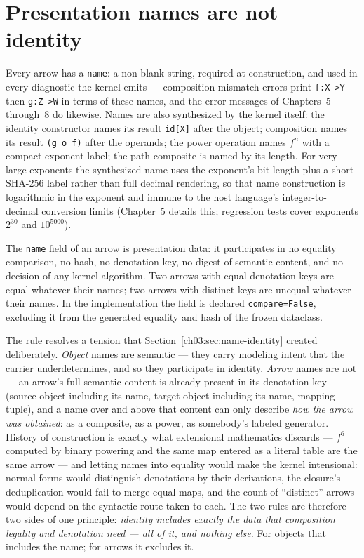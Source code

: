 \section{Presentation names are not identity}\label{ch03:sec:presentation-names}

Every arrow has a \texttt{name}: a non-blank string, required at
construction, and used in every diagnostic the kernel emits ---
composition mismatch errors print
\texttt{f:X->Y} then \texttt{g:Z->W} in terms of these names, and the
error messages of Chapters~5 through~8 do likewise. Names are also
synthesized by the kernel itself: the identity constructor names its
result \texttt{id[X]} after the object; composition names its result
\texttt{(g o f)} after the operands; the power operation names
$f^{n}$ with a compact exponent label; the path composite is named by its
length. For very large exponents the synthesized name uses the exponent's
bit length plus a short SHA-256 label rather than full decimal rendering,
so that name construction is logarithmic in the exponent and immune to the
host language's integer-to-decimal conversion limits (Chapter~5 details
this; regression tests cover exponents $2^{30}$ and $10^{5000}$).

\begin{ruleenv}\label{ch03:rule:names-out}
The \texttt{name} field of an arrow is presentation data: it participates
in no equality comparison, no hash, no denotation key, no digest of
semantic content, and no decision of any kernel algorithm. Two arrows with
equal denotation keys are equal whatever their names; two arrows with
distinct keys are unequal whatever their names. In the implementation the
field is declared \texttt{compare=False}, excluding it from the generated
equality and hash of the frozen dataclass.
\end{ruleenv}

The rule resolves a tension that Section~\ref{ch03:sec:name-identity}
created deliberately. \emph{Object} names are semantic --- they carry
modeling intent that the carrier underdetermines, and so they participate
in identity. \emph{Arrow} names are not --- an arrow's full semantic
content is already present in its denotation key (source object including
its name, target object including its name, mapping tuple), and a name
over and above that content can only describe \emph{how the arrow was
obtained}: as a composite, as a power, as somebody's labeled generator.
History of construction is exactly what extensional mathematics discards
--- $f^{6}$ computed by binary powering and the same map entered as a
literal table are the same arrow --- and letting names into equality would
make the kernel intensional: normal forms would distinguish denotations by
their derivations, the closure's deduplication would fail to merge equal
maps, and the count of ``distinct'' arrows would depend on the syntactic
route taken to each. The two rules are therefore two sides of one
principle: \emph{identity includes exactly the data that composition
legality and denotation need --- all of it, and nothing else.} For
objects that includes the name; for arrows it excludes it.

